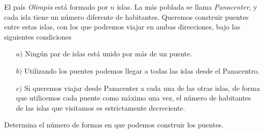 El país {\itshape Olimpia} está formado por $n$ islas. La más poblada se llama {\itshape Panacenter}, y cada isla tiene un número diferente de habitantes. Queremos construir puentes entre estas islas, con los que podremos viajar en ambas direcciones, bajo las siguientes condiciones
\begin{enumerate}
    \item[$a)$] Ningún par de islas está unido por más de un puente.
    \item[$b)$] Utilizando los puentes podemos llegar a todas las islas desde el Panacentro.
    \item[$c)$] Si queremos viajar desde Panacenter a cada una de las otras islas, de forma que utilicemos cada puente como máximo una vez, el número de habitantes de las islas que visitamos es estrictamente decreciente.
\end{enumerate}



Determina el número de formas en que podemos construir los puentes.
